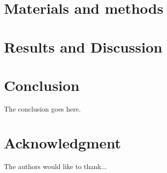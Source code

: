 \documentclass[10pt,conference]{IEEEtran}
\begin{document}

\section{Materials and methods}


\section{Results and Discussion}


\section{Conclusion}
The conclusion goes here.






\section*{Acknowledgment}


The authors would like to thank...









\end{document}
